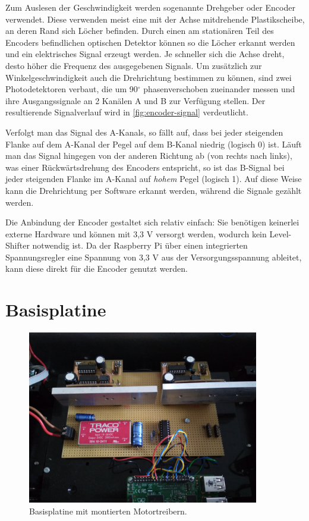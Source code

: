 \documentclass[german]{thesis_KBS}
\begin{document}
Zum Auslesen der Geschwindigkeit werden sogenannte Drehgeber oder Encoder
verwendet. Diese verwenden meist eine mit der Achse mitdrehende Plastikscheibe,
an deren Rand sich Löcher befinden. Durch einen am stationären Teil des Encoders
befindlichen optischen Detektor können so die Löcher erkannt werden und ein
elektrisches Signal erzeugt werden. Je schneller sich die Achse dreht, desto
höher die Frequenz des ausgegebenen Signals. Um zusätzlich zur
Winkelgeschwindigkeit auch die Drehrichtung bestimmen zu können, sind zwei
Photodetektoren verbaut, die um 90$^\circ$ phasenverschoben zueinander messen
und ihre Ausgangssignale an 2 Kanälen A und B zur Verfügung stellen. Der
resultierende Signalverlauf wird in \autoref{fig:encoder-signal} verdeutlicht.

Verfolgt man das Signal des A-Kanals, so fällt auf, dass bei jeder steigenden
Flanke auf dem A-Kanal der Pegel auf dem B-Kanal niedrig (logisch 0) ist. Läuft
man das Signal hingegen von der anderen Richtung ab (von rechts nach links), was
einer Rückwärtsdrehung des Encoders entspricht, so ist das B-Signal bei jeder
steigenden Flanke im A-Kanal auf \emph{hohem} Pegel (logisch 1). Auf diese Weise
kann die Drehrichtung per Software erkannt werden, während die Signale gezählt
werden.

Die Anbindung der Encoder gestaltet sich relativ einfach: Sie benötigen
keinerlei externe Hardware und können mit 3,3 V versorgt werden, wodurch kein
Level-Shifter notwendig ist. Da der Raspberry Pi über einen integrierten
Spannungsregler eine Spannung von 3,3 V aus der Versorgungsspannung ableitet,
kann diese direkt für die Encoder genutzt werden.



\section{Basisplatine}

\begin{figure}
    \centering
    \includegraphics[width=0.9\textwidth]{electronics.jpg}
    \caption{
        Basisplatine mit montierten Motortreibern.
    }
    \label{fig:basisplatine}
\end{figure}
\end{document}
